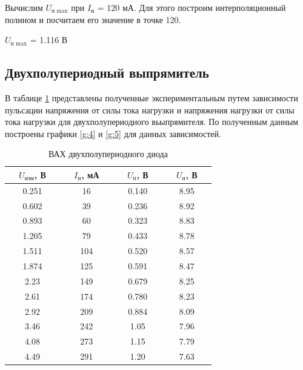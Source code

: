 Вычислим $U_\text{п max}$ при $I_\text{н}$ = 120 мА. Для этого построим интерполяционный полином и посчитаем его значение в точке 120.

$U_\text{п max}$ = 1.116 В

\newpage
\subsection{Двухполупериодный выпрямитель}

В таблице \ref{tab:5:3} представлены полученные экспериментальным путем зависимости пульсации напряжения от силы тока нагрузки и напряжения нагрузки от силы тока нагрузки для двухполупериодного вьыпрямителя. По полученным данным построены графики \ref{g:4} и \ref{g:5} для данных зависимостей.

\begin{table}[H]
	\begin{center}
	\caption{ВАХ двухполупериодного диода}
	\def\arraystretch{1.5}
		\begin{tabular}{|c|c|c|c|}
		\hline 
		\ \ $U_\text{изм}$, В\ \  & \ \ $I_\text{н}$, мА\ \  & \ \ $U_\text{п}$, В\ \  & \ \ $U_\text{н}$, В\ \  \\ \hline
		0.251 & 16 & 0.140 & 8.95 \\ \hline
		0.602 & 39 & 0.236 & 8.92 \\ \hline
		0.893 & 60 & 0.323 & 8.83 \\ \hline
		1.205 & 79 & 0.433 & 8.78 \\ \hline
		1.511 & 104 & 0.520 & 8.57 \\ \hline
		1.874 & 125 & 0.591 & 8.47 \\ \hline
		2.23 & 149 & 0.679 & 8.25 \\ \hline
		2.61 & 174 & 0.780 & 8.23 \\ \hline
		2.92 & 209 & 0.884 & 8.09 \\ \hline
		3.46 & 242 & 1.05 & 7.96 \\ \hline
		4.08 & 273 & 1.15 & 7.79 \\ \hline
		4.49 & 291 & 1.20 & 7.63 \\ \hline
		\end{tabular} 
		\label{tab:5:3}
	\end{center}
\end{table}

